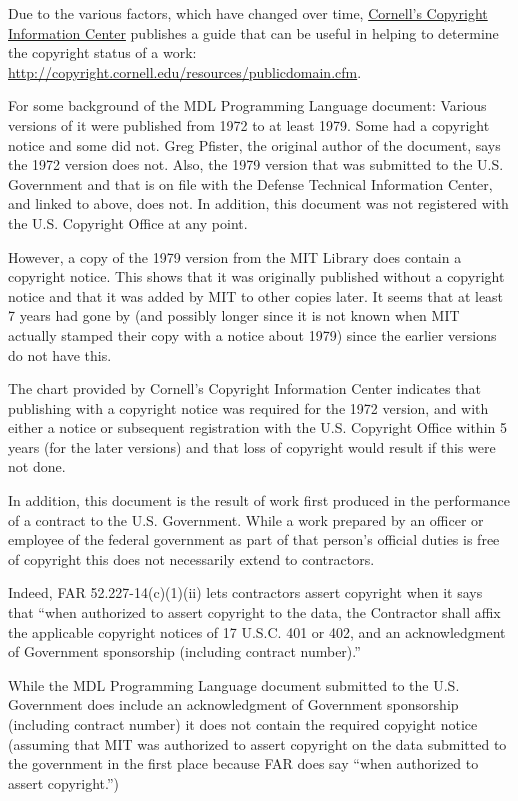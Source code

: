 \documentclass[a4paper,]{article}
\begin{document}
Due to the various factors, which have changed over time, \href{http://copyright.cornell.edu/}{Cornell's Copyright
Information Center} publishes a guide that can be useful in helping to determine the copyright status of a work:
\url{http://copyright.cornell.edu/resources/publicdomain.cfm}.

For some background of the MDL Programming Language document: Various versions of it were published from 1972 to at least
1979. Some had a copyright notice and some did not. Greg Pfister, the original author of the document, says the 1972
version does not. Also, the 1979 version that was submitted to the U.S. Government and that is on file with the Defense
Technical Information Center, and linked to above, does not. In addition, this document was not registered with the U.S.
Copyright Office at any point.

However, a copy of the 1979 version from the MIT Library does contain a copyright notice. This shows that it was originally
published without a copyright notice and that it was added by MIT to other copies later. It seems that at least 7 years had
gone by (and possibly longer since it is not known when MIT actually stamped their copy with a notice about 1979) since the
earlier versions do not have this.

The chart provided by Cornell's Copyright Information Center indicates that publishing with a copyright notice was required
for the 1972 version, and with either a notice or subsequent registration with the U.S. Copyright Office within 5 years
(for the later versions) and that loss of copyright would result if this were not done.

In addition, this document is the result of work first produced in the performance of a contract to the U.S. Government.
While a work prepared by an officer or employee of the federal government as part of that person's official duties is free
of copyright this does not necessarily extend to contractors.

Indeed, FAR 52.227-14(c)(1)(ii) lets contractors assert copyright when it says that ``when authorized to assert copyright
to the data, the Contractor shall affix the applicable copyright notices of 17 U.S.C. 401 or 402, and an acknowledgment of
Government sponsorship (including contract number).''

While the MDL Programming Language document submitted to the U.S. Government does include an acknowledgment of Government
sponsorship (including contract number) it does not contain the required copyight notice (assuming that MIT was authorized
to assert copyright on the data submitted to the government in the first place because FAR does say ``when authorized to
assert copyright.'')
\end{document}
